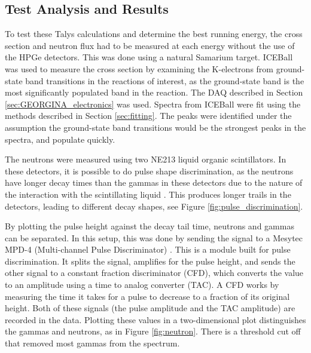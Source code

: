 

\subsection{Test Analysis and Results}

To test these Talys calculations and determine the best running energy, the cross section and neutron flux had to be measured at each energy without the use of the HPGe detectors. This was done using a natural Samarium target. ICEBall was used to measure the cross section by examining the K-electrons from ground-state band transitions in the reactions of interest, as the ground-state band is the most significantly populated band in the reaction. The DAQ described in Section \ref{sec:GEORGINA_electronics} was used. Spectra from ICEBall were fit using the methods described in Section \ref{sec:fitting}. The peaks were identified under the assumption the ground-state band transitions would be the strongest peaks in the spectra, and populate quickly. 

The neutrons were measured using two NE213 liquid organic scintillators. In these detectors, it is possible to do pulse shape discrimination, as the neutrons have longer decay times than the gammas in these detectors due to the nature of the interaction with the scintillating liquid \citep{knoll00:rad_det_meas}. This produces longer trails in the detectors, leading to different decay shapes, see Figure \ref{fig:pulse_discrimination}. 



By plotting the pulse height against the decay tail time, neutrons and gammas can be separated. In this setup, this was done by sending the signal to a Mesytec MPD-4 (Multi-channel Pulse Discriminator) \citep{mesytec:_PSD}. This is a module built for pulse discrimination. It splits the signal, amplifies for the pulse height, and sends the other signal to a constant fraction discriminator (CFD), which converts the value to an amplitude using a time to analog converter (TAC). A CFD works by measuring the time it takes for a pulse to decrease to a fraction of its original height. Both of these signals (the pulse amplitude and the TAC amplitude) are recorded in the data. Plotting these values in a two-dimensional plot distinguishes the gammas and neutrons, as in Figure \ref{fig:neutron}. There is a threshold cut off that removed most gammas from the spectrum.




